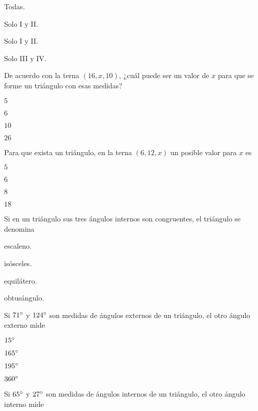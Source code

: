 \documentclass[12pt, fleqn]{article}
\begin{document}
\benu
\item[] \opc Todas. \vf
\item[] \opc Solo I y II. \vf
\item[] \opc Solo I y II. \vf
\item[] \opc Solo III y IV. \vf
\eenu

\pagebreak

\item De acuerdo con la terna $(16,x,10)$, ¿cuál puede ser un valor de $x$ para que se forme un triángulo con esas medidas? \vp

\benu
\item[] \opc $5$\vf
\item[] \opc $6$\vf
\item[] \opc $10$\vf
\item[] \opc $26$
\eenu
\vs

\item Para que exista un triángulo, en la terna $(6,12,x)$ un posible valor para $x$ es \vp

\benu
\item[] \opc $5$\vf
\item[] \opc $6$ \vf
\item[] \opc $8$ \vf
\item[] \opc $18$
\eenu
\vs

\item Si en un triángulo sus tres ángulos internos son congruentes, el triángulo se denomina \vp

\benu
\item[] \opc escaleno. \vf
\item[] \opc isósceles. \vf
\item[] \opc equilátero. \vf
\item[] \opc obtusángulo.
\eenu
\vs

\item Si $71^\circ$ y $124^\circ$ son medidas de ángulos externos de un triángulo, el otro ángulo externo mide \vp

\benu
\item[] \opc $15^\circ$\vf
\item[] \opc $165^\circ$ \vf
\item[] \opc $195^\circ$ \vf
\item[] \opc $360^\circ$
\eenu
\vs

\pagebreak

\item Si $65^\circ$ y $27^\circ$ son medidas de ángulos internos de un triángulo, el otro ángulo interno mide \vp
\end{document}
